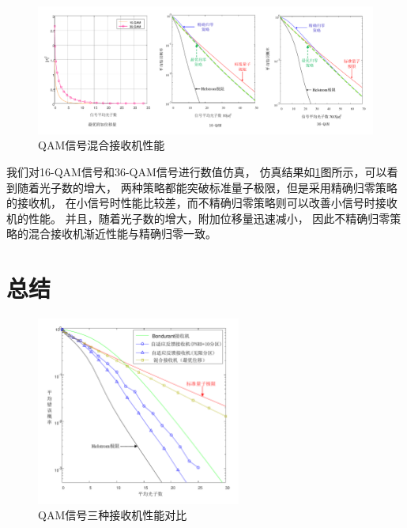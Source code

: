 \begin{figure}
\centering
  \includegraphics[width=\textwidth]{figures/chap3/QAM-Hybrid-error}
  \caption{QAM信号混合接收机性能}
  \label{fig:QAM-Hybrid-error}
\end{figure}


我们对16-QAM信号和36-QAM信号进行数值仿真，
仿真结果如\ref{fig:QAM-Hybrid-error}图所示，可以看到随着光子数的增大，
两种策略都能突破标准量子极限，但是采用精确归零策略的接收机，
在小信号时性能比较差，而不精确归零策略则可以改善小信号时接收机的性能。
并且，随着光子数的增大，附加位移量迅速减小，
因此不精确归零策略的混合接收机渐近性能与精确归零一致。






\section{总结}

\begin{figure}
\centering
  \includegraphics[width=0.6\textwidth]{figures/chap3/QAM-error}
  \caption{QAM信号三种接收机性能对比}
  \label{fig:QAM-error}
\end{figure}

